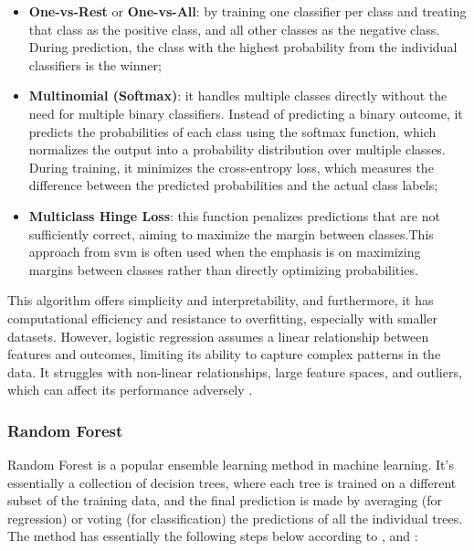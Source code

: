 \begin{itemize}
    \item \textbf{One-vs-Rest} or \textbf{One-vs-All}: by training one classifier per class and treating that class as the positive class, and all other classes as the negative class. During prediction, the class with the highest probability from the individual classifiers is the winner;
    \item \textbf{Multinomial (Softmax)}: it handles multiple classes directly without the need for multiple binary classifiers. Instead of predicting a binary outcome, it predicts the probabilities of each class using the softmax function, which normalizes the output into a probability distribution over multiple classes. During training, it minimizes the cross-entropy loss, which measures the difference between the predicted probabilities and the actual class labels;
    \item \textbf{Multiclass Hinge Loss}: this function penalizes predictions that are not sufficiently correct, aiming to maximize the margin between classes.This approach from \gls{svm} is often used when the emphasis is on maximizing margins between classes rather than directly optimizing probabilities.
\end{itemize}

This algorithm offers simplicity and interpretability, and furthermore, it has computational efficiency and resistance to overfitting, especially with smaller datasets. However, logistic regression assumes a linear relationship between features and outcomes, limiting its ability to capture complex patterns in the data. It struggles with non-linear relationships, large feature spaces, and outliers, which can affect its performance adversely \cite{Russel2010}.


\subsubsection{Random Forest}
\label{subsubsec:machine_learning_random_forest}

Random Forest is a popular ensemble learning method in machine learning. It's essentially a collection of decision trees, where each tree is trained on a different subset of the training data, and the final prediction is made by averaging (for regression) or voting (for classification) the predictions of all the individual trees. The method has essentially the following steps below according to \textcite{Breiman2001}, \textcite{Hartshorn2016} and \textcite{Genuer2020}:

